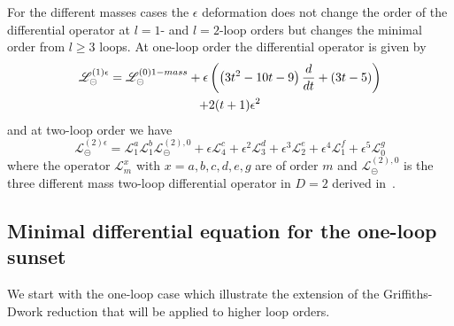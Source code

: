 \documentclass[a4paper,12pt]{article}
\numberwithin{equation}{section}
\numberwithin{figure}{section}
\def\su{\circleddash}
\begin{document}
For the different masses cases the $\epsilon$ deformation does not
change the order of the differential operator at $l=1$- and $l=2$-loop
orders but changes the minimal order from  $l\geq3$ loops.
At one-loop order the differential operator is given by
\begin{multline}
    \mathscr{L}_\su^{(1)\epsilon} =
    \mathscr{L}_\su^{(0)1-mass}  + \epsilon 
    \left(\left(3 t^2-10
        t-9\right) {d\over dt}+(3t-5)\right)\cr +2 (t+1)
    \epsilon ^2
  \end{multline}
  and at two-loop order we have
  \begin{equation}
     \mathscr{L}^{(2)\epsilon}_\su =   \mathscr{L}^{a}_1
     \mathscr{L}^{b}_1    \mathscr{L}^{(2),0}_\su +\epsilon
     \mathscr{L}^{c}_4+\epsilon^2  \mathscr{L}^{d}_3+\epsilon^3
     \mathscr{L}^{e}_2+ \epsilon^4 \mathscr{L}^{f}_1 +\epsilon^5
   \mathscr{L}^{g}_0
   \end{equation} 
   where the operator $ \mathscr{L}^{x}_m$  with $x=a,b,c,d,e,g$ are
   of order $m$  and $ \mathscr{L}^{(2),0}_\su $ is the three
   different mass two-loop differential operator in $D=2$ derived in~\cite{Remiddi:2016gno,Bloch:2016izu,Muller-Stach:2011qkg}.
  

\subsection{Minimal differential equation for the one-loop sunset}\label{sec:one-loop-case}

We start with the one-loop case which illustrate the extension of the
Griffiths-Dwork reduction that will be applied to higher loop orders.
\end{document}

